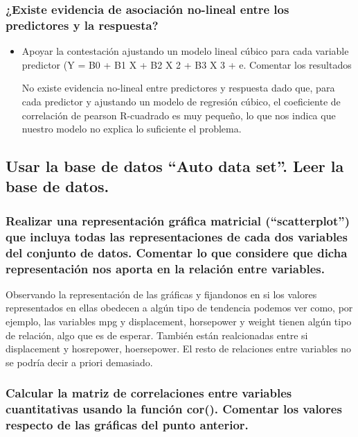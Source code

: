 \subsubsection{¿Existe evidencia de asociación no-lineal entre los predictores y la respuesta?}
\begin{itemize}

\item Apoyar la contestación ajustando un modelo lineal cúbico para cada variable predictor (Y = B0 + B1 X + B2 X 2 + B3 X 3 + e. Comentar los resultados

No existe evidencia no-lineal entre predictores y respuesta dado que, para cada predictor y ajustando un modelo de regresión cúbico, el coeficiente de correlación de pearson R-cuadrado es muy pequeño, lo que nos indica que nuestro modelo no explica lo suficiente el problema.

\end{itemize}



\subsection{Usar la base de datos “Auto data set”. Leer la base de datos.}

\subsubsection{Realizar una representación gráfica matricial (“scatterplot”) que incluya todas las representaciones de cada dos variables del conjunto de datos. Comentar lo que considere que dicha representación nos aporta en la relación entre variables.}

Observando la representación de las gráficas y fijandonos en si los valores representados en ellas obedecen a algún tipo de tendencia podemos ver como, por ejemplo, las variables mpg y displacement, horsepower y weight tienen algún tipo de relación, algo que es de esperar. También están realcionadas entre si displacement y hosrepower, hoersepower. El resto de relaciones entre variables no se podría decir a priori demasiado.

\subsubsection{Calcular la matriz de correlaciones entre variables cuantitativas usando la función cor(). Comentar los valores respecto de las gráficas del punto anterior.}

